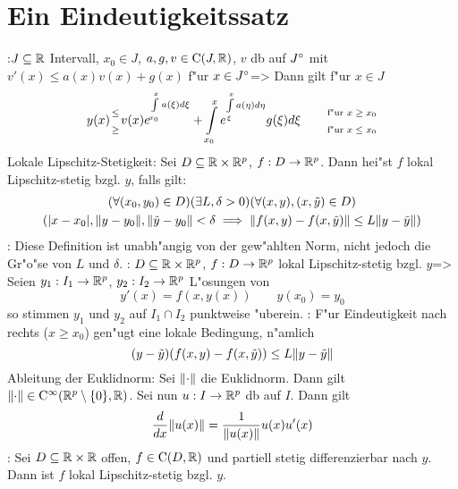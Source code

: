 \section{Ein Eindeutigkeitssatz}
\theorem:$J\subseteq\mathbb R$ Intervall, $x_0\in J$, 
  $a,g,v\in{\rm C}(J,\mathbb R)$, $v$ db auf ${J}^\circ$ mit
  $v'(x)\leq a(x)v(x)+g(x)$ f"ur $x\in{J}^\circ$=>{
  Dann gilt f"ur $x\in J$
  \[y(x)\stack(\leq;\geq) v(x)
    e^{\int_{x_0}^x a(\xi)d\xi}+\int_{x_0}^x e^{\int_\xi^x a(\eta)d\eta}g(\xi)d\xi
     \qquad\stack(\text{f"ur $x\geq x_0$};\text{f"ur $x\leq x_0$})
    \]
  }
 Lokale Lipschitz-Stetigkeit:{
  Sei $D\subseteq\mathbb R\times\mathbb R^p$, $f:D\to\mathbb R^p$.
  Dann hei"st $f$ lokal Lipschitz-stetig bzgl. $y$, falls gilt:
  \begin{multline*}
    (\forall (x_0,y_0)\in D)(\exists L,\delta >0)(\forall (x,y),(x,\tilde y)\in D) \\
      (|x-x_0|,{\left\| y-y_0\right\|},{\left\| \tilde y-y_0\right\|}<\delta\implies
      {\left\| f(x,y)-f(x,\tilde y)\right\|}\leq L{\left\| y-\tilde y\right\|})
    \end{multline*}
  }
\remark:{
  Diese Definition ist unabh"angig von der gew"ahlten Norm, nicht jedoch
  die Gr"o"se von $L$ und $\delta$.
  }
\theorem:
  $D\subseteq\mathbb R\times\mathbb R^p$, $f:D\to\mathbb R^p$ lokal Lipschitz-stetig
  bzgl. $y$=>{
  \label{the:eindeutig}
  Seien $y_1:I_1\to\mathbb R^p$, $y_2:I_2\to\mathbb R^p$ L"osungen von
  \[y'(x)=f(x,y(x))\qquad y(x_0)=y_0
    \]
  so stimmen $y_1$ und $y_2$ auf $I_1\cap I_2$ punktweise "uberein.
  }
\remark:{
  F"ur Eindeutigkeit nach rechts ($x\geq x_0$) gen"ugt eine lokale
  Bedingung, n"amlich
  \[(y-\tilde y)(f(x,y)-f(x,\tilde y))\leq L{\left\| y-\tilde y\right\|}
    \]
  }
\remark Ableitung der Euklidnorm:{
  Sei ${\left\| \cdot\right\|}$ die Euklidnorm. Dann gilt 
  ${\left\| \cdot\right\|}\in{\rm C}^\infty(\mathbb R^p\setminus\{0\},\mathbb R)$. Sei nun 
  $u:I\to\mathbb R^p$ db auf $I$. Dann gilt
  \[\frac d {dx} {\left\| u(x)\right\|}=\frac 1{{\left\| u(x)\right\|}} u(x)u'(x)
    \]
  }
\remark:{
  Sei $D\subseteq\mathbb R\times\mathbb R$ offen, $f\in{\rm C}(D,\mathbb R)$ und partiell
  stetig differenzierbar nach $y$. 
  Dann ist $f$ lokal Lipschitz-stetig bzgl. $y$.
  }

